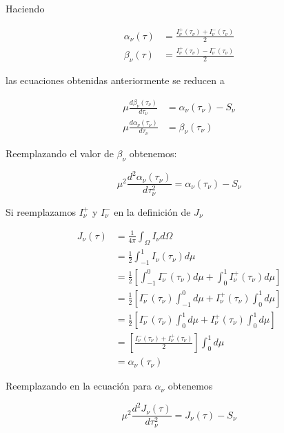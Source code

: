 \documentclass[10pt,spanish,a4paper]{practice}
\begin{document}
\begin{problem}
\begin{solution}
            Haciendo

            \begin{align*}
                \alpha_{\nu}(\tau) &=  \frac{I_{\nu}^{+}\left(\tau_{\nu}\right) + I_{\nu}^{-}\left(\tau_{\nu}\right)}{2}\\
                \beta_{\nu}(\tau) &= \frac{I_{\nu}^{+}\left(\tau_{\nu}\right) - I_{\nu}^{-}\left(\tau_{\nu}\right)}{2}
            \end{align*}

            las ecuaciones obtenidas anteriormente se reducen a

            \begin{align*}
                \mu \frac{d\beta_{\nu}\left(\tau_\nu\right)}{d\tau_{\nu}} &= \alpha_{\nu}\left(\tau_\nu\right) - S_{\nu} \\
                \mu \frac{d\alpha_{\nu}\left(\tau_\nu\right)}{d\tau_{\nu}} &= \beta_{\nu}\left(\tau_\nu\right)
            \end{align*}

            Reemplazando el valor de $\beta_{\nu}$ obtenemos:

            \begin{equation*}
                \mu^2 \frac{{d^2}\alpha_{\nu}(\tau_\nu)}{d{\tau_{\nu}^2}} = \alpha_{\nu}(\tau_\nu) - S_{\nu}
            \end{equation*}

            Si reemplazamos $I_\nu^{+}$ y $I_\nu^{-}$ en la definición de $J_\nu$

            \begin{align*}
                J_{\nu}(\tau) &= \frac{1}{4\pi}\int_{\Omega} I_\nu d{\Omega} \\
                  &= \frac{1}{2}\int_{-1}^{1} I_\nu\left(\tau_\nu\right)d{\mu} \\
                  &= \frac{1}{2}\left[\int_{-1}^{0} I_\nu^{-}\left(\tau_\nu\right)d{\mu} + \int_{0}^{1} I_\nu^{+}\left(\tau_\nu\right)d{\mu} \right] \\
                  &= \frac{1}{2}\left[I_\nu^{-}\left(\tau_\nu\right) \int_{-1}^{0} d{\mu} + I_\nu^{+}\left(\tau_\nu\right) \int_{0}^{1} d{\mu} \right] \\
                  &= \frac{1}{2}\left[I_\nu^{-}\left(\tau_\nu\right) \int_{0}^{1} d{\mu} + I_\nu^{+}\left(\tau_\nu\right) \int_{0}^{1} d{\mu} \right] \\
                  &= \left[\frac{I_\nu^{-}\left(\tau_\nu\right)  + I_\nu^{+}\left(\tau_\nu\right)}{2} \right] \int_{0}^{1} d{\mu} \\
                  &= \alpha_\nu\left(\tau_\nu\right)
            \end{align*}

            Reemplazando en la ecuación para $\alpha_\nu$ obtenemos

            \begin{equation*}
                \mu^2 \frac{{d^2}J_{\nu}(\tau)}{d{\tau_{\nu}^2}} = J_{\nu}(\tau) - S_{\nu}
            \end{equation*}

        \end{solution}
    \end{problem}
\end{document}
